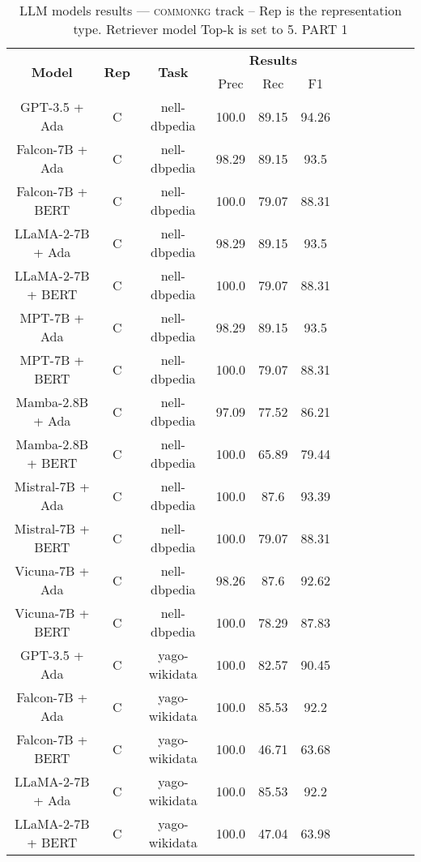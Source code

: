 \begin{table}
        \centering
        \small
        \caption{LLM models results --- \textsc{commonkg} track -- Rep is the representation type. Retriever model Top-k is set to 5. PART 1 } \label{tab:llm_commonkg1}
        \begin{tabular}{|c|c|c|c|c|c|c|c|c|c|c|c|}
            \hline
             \multirow{2}{*}{\textbf{Model}}  & \multirow{2}{*}{\textbf{Rep}}  & \multirow{2}{*}{\textbf{Task}} &  \multicolumn{3}{c|}{\textbf{Results}} \\
             \cline{4-6}
              & & & Prec & Rec & F1  \\
            \hline
	GPT-3.5 + Ada  & C & nell-dbpedia  &  100.0 &  89.15 & 94.26  \\
	Falcon-7B + Ada  & C & nell-dbpedia  &  98.29 &  89.15 & 93.5  \\
	Falcon-7B + BERT  & C & nell-dbpedia  &  100.0 &  79.07 & 88.31  \\
	LLaMA-2-7B + Ada  & C & nell-dbpedia  &  98.29 &  89.15 & 93.5  \\
	LLaMA-2-7B + BERT  & C & nell-dbpedia  &  100.0 &  79.07 & 88.31  \\
	MPT-7B + Ada  & C & nell-dbpedia  &  98.29 &  89.15 & 93.5  \\
	MPT-7B + BERT  & C & nell-dbpedia  &  100.0 &  79.07 & 88.31  \\
	Mamba-2.8B + Ada  & C & nell-dbpedia  &  97.09 &  77.52 & 86.21  \\
	Mamba-2.8B + BERT  & C & nell-dbpedia  &  100.0 &  65.89 & 79.44  \\
	Mistral-7B + Ada  & C & nell-dbpedia  &  100.0 &  87.6 & 93.39  \\
	Mistral-7B + BERT  & C & nell-dbpedia  &  100.0 &  79.07 & 88.31  \\
	Vicuna-7B + Ada  & C & nell-dbpedia  &  98.26 &  87.6 & 92.62  \\
	Vicuna-7B + BERT  & C & nell-dbpedia  &  100.0 &  78.29 & 87.83  \\
	\hline
	GPT-3.5 + Ada  & C & yago-wikidata  &  100.0 &  82.57 & 90.45  \\
	Falcon-7B + Ada  & C & yago-wikidata  &  100.0 &  85.53 & 92.2  \\
	Falcon-7B + BERT  & C & yago-wikidata  &  100.0 &  46.71 & 63.68  \\
	LLaMA-2-7B + Ada  & C & yago-wikidata  &  100.0 &  85.53 & 92.2  \\
	LLaMA-2-7B + BERT  & C & yago-wikidata  &  100.0 &  47.04 & 63.98  \\

\end{tabular}
\end{table}
